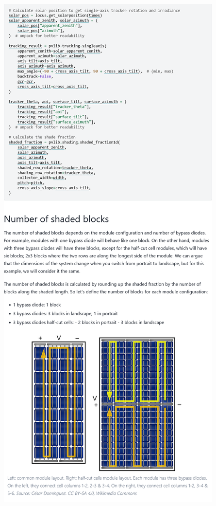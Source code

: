 \begin{myparindent}{0pt}
\includegraphics[width=\linewidth,height=0.9\textheight,keepaspectratio]{images/docs_examples_cut/bypass_diodes_1.png}


\end{myparindent}
